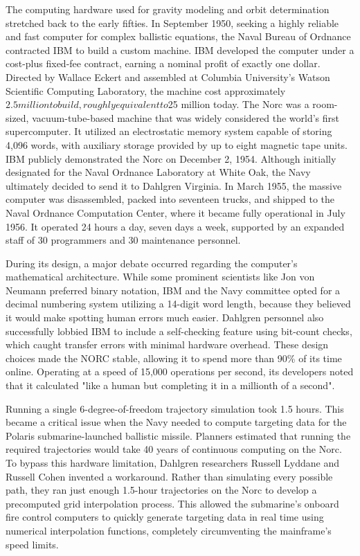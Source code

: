 The computing hardware used for gravity modeling and orbit determination stretched back to the early fifties. In September 1950, seeking a highly reliable and fast computer for complex ballistic equations, the Naval Bureau of Ordnance contracted IBM to build a custom machine. IBM developed the computer under a cost-plus fixed-fee contract, earning a nominal profit of exactly one dollar. Directed by Wallace Eckert and assembled at Columbia University's Watson Scientific Computing Laboratory, the machine cost approximately $2.5 million to build, roughly equivalent to $25 million today. The Norc was a room-sized, vacuum-tube-based machine that was widely considered the world's first supercomputer. It utilized an electrostatic memory system capable of storing 4,096 words, with auxiliary storage provided by up to eight magnetic tape units. IBM publicly demonstrated the Norc on December 2, 1954. Although initially designated for the Naval Ordnance Laboratory at White Oak, the Navy ultimately decided to send it to Dahlgren Virginia. In March 1955, the massive computer was disassembled, packed into seventeen trucks, and shipped to the Naval Ordnance Computation Center, where it became fully operational in July 1956. It operated 24 hours a day, seven days a week, supported by an expanded staff of 30 programmers and 30 maintenance personnel.

During its design, a major debate occurred regarding the computer's mathematical architecture. While some prominent scientists like Jon von Neumann preferred binary notation, IBM and the Navy committee opted for a decimal numbering system utilizing a 14-digit word length, because they believed it would make spotting human errors much easier. Dahlgren personnel also successfully lobbied IBM to include a self-checking feature using bit-count checks, which caught transfer errors with minimal hardware overhead. These design choices made the NORC stable, allowing it to spend more than 90\% of its time online. Operating at a speed of 15,000 operations per second, its developers noted that it calculated "like a human but completing it in a millionth of a second".

Running a single 6-degree-of-freedom trajectory simulation took 1.5 hours. This became a critical issue when the Navy needed to compute targeting data for the Polaris submarine-launched ballistic missile. Planners estimated that running the required trajectories would take 40 years of continuous computing on the Norc. To bypass this hardware limitation, Dahlgren researchers Russell Lyddane and Russell Cohen invented a workaround. Rather than simulating every possible path, they ran just enough 1.5-hour trajectories on the Norc to develop a precomputed grid interpolation process. This allowed the submarine's onboard fire control computers to quickly generate targeting data in real time using numerical interpolation functions, completely circumventing the mainframe's speed limits.

